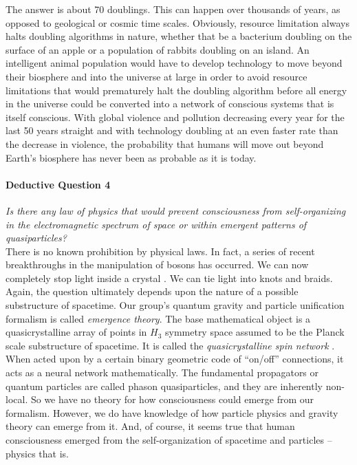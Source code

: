 \documentclass[submission,copyright,creativecommons]{eptcs}
\begin{document}
The answer is about 70 doublings. This can happen over thousands of years, as opposed to geological or cosmic time scales. Obviously, resource limitation always halts doubling algorithms in nature, whether that be a bacterium doubling on the surface of an apple or a population of rabbits doubling on an island. An intelligent animal population would have to develop technology to move beyond their biosphere and into the universe at large in order to avoid resource limitations that would prematurely halt the doubling algorithm before all energy in the universe could be converted into a network of conscious systems that is itself conscious. With global violence and pollution decreasing every year for the last 50 years straight and with technology doubling at an even faster rate than the decrease in violence, the probability that humans will move out beyond Earth’s biosphere has never been as probable as it is today.

\paragraph{\textbf{Deductive Question 4}}

\textit{Is there any law of physics that would prevent consciousness from self-organizing in the electromagnetic spectrum of space or within emergent patterns of quasiparticles?}\\

There is no known prohibition by physical laws. In fact, a series of recent breakthroughs in the manipulation of bosons has occurred. We can now completely stop light inside a crystal \cite{tsakmakidis2014completely}. We can tie light into knots and braids. Again, the question ultimately depends upon the nature of a possible substructure of spacetime. Our group’s quantum gravity and particle unification formalism is called \textit{emergence theory}. The base mathematical object is a quasicrystalline array of points in $H_{3}$ symmetry space assumed to be the Planck scale substructure of spacetime. It is called the \textit{quasicrystalline spin network} \cite{fang2015icosahedral}. When acted upon by a certain binary geometric code of “on/off” connections, it acts as a neural network mathematically. The fundamental propagators or quantum particles are called phason quasiparticles, and they are inherently non-local. So we have no theory for how consciousness could emerge from our formalism. However, we do have knowledge of how particle physics and gravity theory can emerge from it. And, of course, it seems true that human consciousness emerged from the self-organization of spacetime and particles -- physics that is.
\end{document}
